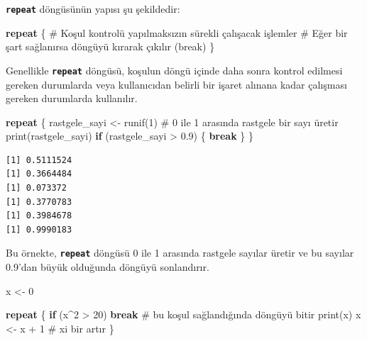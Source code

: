\documentclass[
  letterpaper,
  DIV=11,
  numbers=noendperiod]{scrreprt}
\newenvironment{Shaded}{\begin{snugshade}}{\end{snugshade}}
\newcommand{\CommentTok}[1]{\textcolor[rgb]{0.37,0.37,0.37}{#1}}
\newcommand{\ControlFlowTok}[1]{\textcolor[rgb]{0.00,0.23,0.31}{\textbf{#1}}}
\newcommand{\DecValTok}[1]{\textcolor[rgb]{0.68,0.00,0.00}{#1}}
\newcommand{\FloatTok}[1]{\textcolor[rgb]{0.68,0.00,0.00}{#1}}
\newcommand{\FunctionTok}[1]{\textcolor[rgb]{0.28,0.35,0.67}{#1}}
\newcommand{\NormalTok}[1]{\textcolor[rgb]{0.00,0.23,0.31}{#1}}
\newcommand{\OtherTok}[1]{\textcolor[rgb]{0.00,0.23,0.31}{#1}}
\newcommand{\SpecialCharTok}[1]{\textcolor[rgb]{0.37,0.37,0.37}{#1}}
\begin{document}
\textbf{\texttt{repeat}} döngüsünün yapısı şu şekildedir:

\begin{Shaded}
\begin{Highlighting}[]
\ControlFlowTok{repeat}\NormalTok{ \{}
  \CommentTok{\# Koşul kontrolü yapılmaksızın sürekli çalışacak işlemler}
  \CommentTok{\# Eğer bir şart sağlanırsa döngüyü kırarak çıkılır (break)}
\NormalTok{\}}
\end{Highlighting}
\end{Shaded}

Genellikle \textbf{\texttt{repeat}} döngüsü, koşulun döngü içinde daha
sonra kontrol edilmesi gereken durumlarda veya kullanıcıdan belirli bir
işaret alınana kadar çalışması gereken durumlarda kullanılır.

\begin{Shaded}
\begin{Highlighting}[]
\ControlFlowTok{repeat}\NormalTok{ \{}
\NormalTok{  rastgele\_sayi }\OtherTok{\textless{}{-}} \FunctionTok{runif}\NormalTok{(}\DecValTok{1}\NormalTok{)  }\CommentTok{\# 0 ile 1 arasında rastgele bir sayı üretir}
  \FunctionTok{print}\NormalTok{(rastgele\_sayi)}
  \ControlFlowTok{if}\NormalTok{ (rastgele\_sayi }\SpecialCharTok{\textgreater{}} \FloatTok{0.9}\NormalTok{) \{}
    \ControlFlowTok{break}
\NormalTok{  \}}
\NormalTok{\}}
\end{Highlighting}
\end{Shaded}

\begin{verbatim}
[1] 0.5111524
[1] 0.3664484
[1] 0.073372
[1] 0.3770783
[1] 0.3984678
[1] 0.9990183
\end{verbatim}

Bu örnekte, \textbf{\texttt{repeat}} döngüsü 0 ile 1 arasında rastgele
sayılar üretir ve bu sayılar 0.9'dan büyük olduğunda döngüyü
sonlandırır.

\begin{Shaded}
\begin{Highlighting}[]
\NormalTok{x }\OtherTok{\textless{}{-}} \DecValTok{0}

\ControlFlowTok{repeat}\NormalTok{ \{}
    \ControlFlowTok{if}\NormalTok{ (x}\SpecialCharTok{\^{}}\DecValTok{2} \SpecialCharTok{\textgreater{}} \DecValTok{20}\NormalTok{) }\ControlFlowTok{break}     \CommentTok{\# bu koşul sağlandığında döngüyü bitir}
    \FunctionTok{print}\NormalTok{(x)               }
\NormalTok{    x }\OtherTok{\textless{}{-}}\NormalTok{ x }\SpecialCharTok{+} \DecValTok{1}              \CommentTok{\# x\textquotesingle{}i bir artır}
\NormalTok{\}}
\end{Highlighting}
\end{Shaded}
\end{document}
